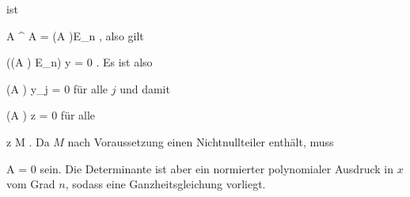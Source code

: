 {ist

\mavergleichskette
{\vergleichskette
{ A ^{  } A
}
{ = }{ (\det  A )E_n
}
{  }{
}
{    }{
}
{   }{
}
}
{}{}{,}
also gilt

\mavergleichskettedisp
{\vergleichskette
{ ((\det  A ) E_n) y
}
{ =} { 0
}
{ } {
}
{ } {
}
{ } {
}
}
{}{}{.}
Es ist also

\mavergleichskette
{\vergleichskette
{ (\det  A ) y_j
}
{ = }{ 0
}
{  }{
}
{    }{
}
{   }{
}
}
{}{}{}
für alle $j$ und damit

\mavergleichskettedisp
{\vergleichskette
{ (\det  A ) z
}
{ =} { 0
}
{ } {
}
{ } {
}
{ } {
}
}
{}{}{}
für alle

\mavergleichskette
{\vergleichskette
{z
}
{ \in }{ M
}
{  }{
}
{    }{
}
{   }{
}
}
{}{}{.}
Da $M$ nach Voraussetzung einen Nichtnullteiler enthält, muss

\mavergleichskette
{\vergleichskette
{ \det  A
}
{ = }{ 0
}
{  }{
}
{    }{
}
{   }{
}
}
{}{}{}
sein. Die Determinante ist aber ein normierter polynomialer Ausdruck in $x$ vom Grad $n$, sodass eine Ganzheitsgleichung vorliegt.




}






